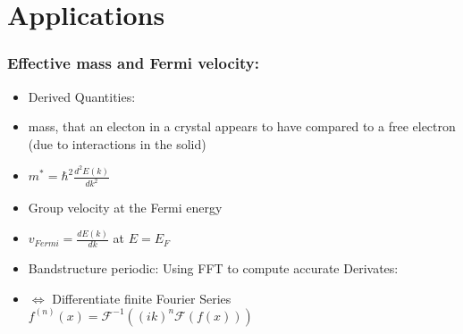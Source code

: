 
\section{Applications} 

\begin{frame}\frametitle{Effective mass and Fermi velocity:}
\begin{itemize}

\item Derived Quantities:


    \item mass, that an electon in a crystal appears to have compared to a free electron (due to interactions in the solid)
    \item $m^{*} = \hbar^2  \frac{d^2E(k)}{dk^2}$
    \
    \item Group velocity at the Fermi energy
    \item $v_{Fermi} = \frac{dE(k)}{dk}$ at $E = E_F$ 


    \item Bandstructure periodic: Using FFT to compute accurate Derivates:
    \item $\Leftrightarrow$ Differentiate finite Fourier Series
    $f^{(n)}(x) = \mathcal{F}^{-1}\left((ik)^n\mathcal{F}(f(x))\right)$
\end{itemize}
\end{frame}
